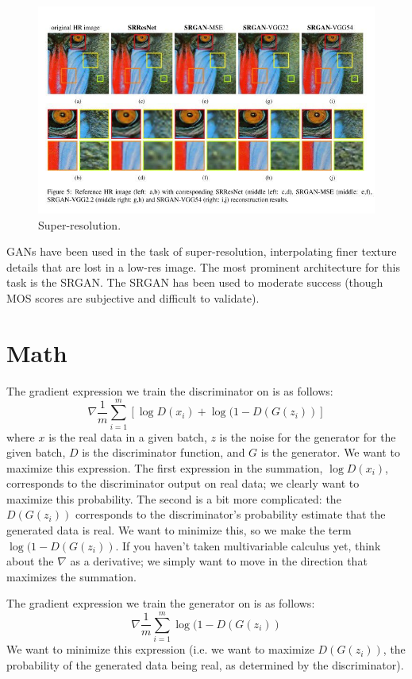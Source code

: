 \documentclass{article}
\begin{document}
    \begin{figure}[H]
        \centerline{\includegraphics[scale=0.4]{superres.jpg}}
        \caption{Super-resolution.}
        \label{fig:super-resolution}
    \end{figure}
    
    GANs have been used in the task of super-resolution, interpolating finer texture details that are lost in a low-res image. The most prominent architecture for this task is the SRGAN. The SRGAN has been used to moderate success (though MOS scores are subjective and difficult to validate). 
    
    
\section{Math}
    The gradient expression we train the discriminator on is as follows:
    $$\nabla \frac{1}{m} \sum_{i=1}^m [\log D(x_i) + \log(1-D(G(z_i))]$$
    where $x$ is the real data in a given batch, $z$ is the noise for the generator for the given batch, $D$ is the discriminator function, and $G$ is the generator. We want to maximize this expression. The first expression in the summation, $\log D(x_i)$, corresponds to the discriminator output on real data; we clearly want to maximize this probability. The second is a bit more complicated: the $D(G(z_i))$ corresponds to the discriminator's probability estimate that the generated data is real. We want to minimize this, so we make the term $\log (1-D(G(z_i))$. If you haven't taken multivariable calculus yet, think about the $\nabla$ as a derivative; we simply want to move in the direction that maximizes the summation.
    
    The gradient expression we train the generator on is as follows:
    $$\nabla \frac{1}{m} \sum_{i=1}^m \log(1-D(G(z_i))$$
    We want to minimize this expression (i.e. we want to maximize $D(G(z_i))$, the probability of the generated data being real, as determined by the discriminator).
    
\end{document}
